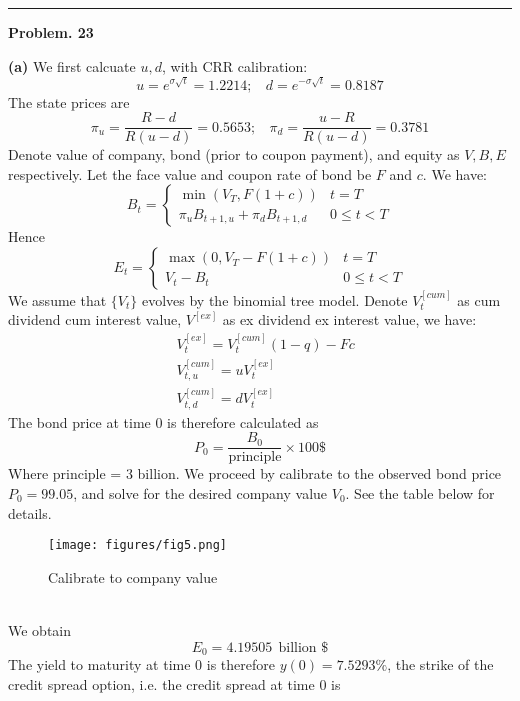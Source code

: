 \documentclass[10 pt]{hwtemplate} %
\begin{document}
\noindent\rule{16cm}{0.4pt}
\textbf{Problem. 23} 
\begin{solution} \textbf{(a)}
We first calcuate $u,d$, with CRR calibration:
\begin{equation}
  u = e^{\sigma \sqrt{t}}=1.2214;~~~~d = e^{-\sigma \sqrt{t}}=0.8187
\end{equation}
The state prices are
\begin{equation}
  \pi_u = \frac{R-d}{R(u-d)} = 0.5653;~~~~  \pi_d = \frac{u-R}{R(u-d)} = 0.3781
\end{equation}
Denote value of company, bond (prior to coupon payment), and equity as $V, B, E$ respectively. Let the face value and coupon rate of bond be $F$ and $c$. We have:
$$
B_t = \begin{cases}\min(V_T, F(1+c)) & t=T\\
\pi_u B_{t+1, u}+\pi_d B_{t+1, d} & 0\leq t< T
\end{cases}
$$
Hence
$$
E_t =\begin{cases}\max(0, V_T - F(1+c)) & t=T \\
V_t -B_t & 0\leq t< T
\end{cases}
$$
We assume that $\{V_t\}$ evolves by the binomial tree model. Denote $V_t^{[cum]}$ as cum dividend cum interest value, $V^{[ex]}$ as ex dividend ex interest value, we have:
\begin{equation}
  \begin{split}
     &V_t^{[ex]} = V_t^{[cum]}(1-q) - Fc\\
     &V_{t,u}^{[cum]} = uV_{t}^{[ex]}\\
     &V_{t,d}^{[cum]} = dV_{t}^{[ex]}
  \end{split}
\end{equation}
The bond price at time $0$ is therefore calculated as
$$
P_0 = \frac{B_0}{\text{principle}} \times 100\$
$$
Where principle = 3 billion. We proceed by calibrate to the observed bond price $P_0 = 99.05$, and solve for the desired company value $V_0$. See the table below for details.
\begin{figure}[H]
  \centering
  \captionsetup{justification=centering}
  \caption{Calibrate to company value}
  \texttt{[image: figures/fig5.png]}
\end{figure}
~\\
We obtain
$$
E_0 = 4.19505~~\text{billion \$}
$$
The yield to maturity at time 0 is therefore $y(0) = 7.5293\%$, the strike of the credit spread option, i.e. the credit spread at time 0 is

\end{solution}
\end{document}

